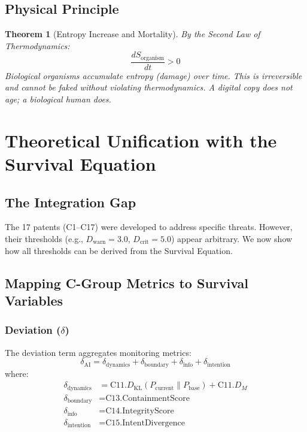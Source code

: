 \documentclass[11pt,a4paper]{article}
\newtheorem{theorem}{Theorem}
\newcommand{\DKL}{D_{\text{KL}}}
\begin{document}
\subsection{Physical Principle}

\begin{theorem}[Entropy Increase and Mortality]
By the Second Law of Thermodynamics:
\begin{equation}
\frac{dS_{\text{organism}}}{dt} > 0
\end{equation}
Biological organisms accumulate entropy (damage) over time.
This is irreversible and cannot be faked without violating thermodynamics.
A digital copy does not age; a biological human does.
\end{theorem}

\section{Theoretical Unification with the Survival Equation}
\label{sec:unification}

\subsection{The Integration Gap}

The 17 patents (C1--C17) were developed to address specific threats.
However, their thresholds (e.g., $D_{\text{warn}} = 3.0$, $D_{\text{crit}} = 5.0$) appear arbitrary.
We now show how all thresholds can be derived from the Survival Equation.

\subsection{Mapping C-Group Metrics to Survival Variables}

\subsubsection{Deviation ($\delta$)}

The deviation term aggregates monitoring metrics:
\begin{equation}
\delta_{\text{AI}} = \delta_{\text{dynamics}} + \delta_{\text{boundary}} + \delta_{\text{info}} + \delta_{\text{intention}}
\end{equation}
where:
\begin{align}
\delta_{\text{dynamics}} &= \text{C11.}\DKL(P_{\text{current}} \| P_{\text{base}}) + \text{C11.}D_M \\
\delta_{\text{boundary}} &= \text{C13.ContainmentScore} \\
\delta_{\text{info}} &= \text{C14.IntegrityScore} \\
\delta_{\text{intention}} &= \text{C15.IntentDivergence}
\end{align}
\end{document}
